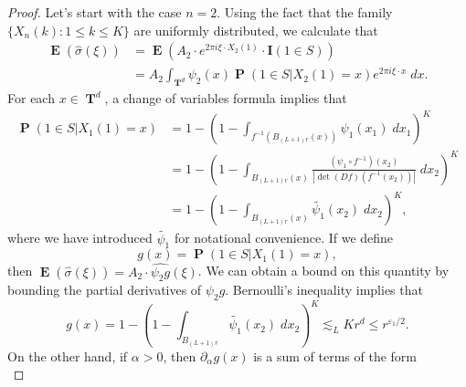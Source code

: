 \documentclass[dvipsnames,letterpaper,12pt]{article}
\numberwithin{equation}{section}
\DeclareMathOperator{\TT}{\mathbf{T}}
\numberwithin{theorem}{section}
\DeclareMathOperator{\EE}{\mathbf{E}}
\DeclareMathOperator{\PP}{\mathbf{P}}
\begin{document}
\begin{proof}


    Let's start with the case $n = 2$. Using the fact that the family $\{ X_n(k) : 1 \leq k \leq K \}$ are uniformly distributed, we calculate that
    \begin{equation} \label{equationDJACIOJCOWIJ}
    \begin{split}
        \EE(\widehat{\sigma}(\xi)) &= \EE ( A_2 \cdot e^{2 \pi i \xi \cdot X_2(1)} \cdot \mathbf{I}(1 \in S) )\\
        &= A_2 \int_{\TT^d} \psi_2(x) \PP \left( 1 \in S | X_2(1) = x \right) e^{2 \pi i \xi \cdot x}\; dx.
    \end{split}
    \end{equation}
    For each $x \in \TT^d$, a change of variables formula implies that
    \begin{equation}
    \begin{split}
        \PP(1 \in S | X_1(1) = x) &= 1 - \left( 1 - \int_{f^{-1}(B_{(L+1)r}(x))} \psi_1(x_1)\; dx_1 \right)^K\\
        &= 1 - \left( 1 - \int_{B_{(L+1) r}(x)} \frac{(\psi_1 \circ f^{-1})(x_2)}{|\det(Df)(f^{-1}(x_2))|}\; dx_2 \right)^K\\
        &= 1 - \left( 1 - \int_{B_{(L+1)r}(x)} \tilde{\psi_1}(x_2)\; dx_2 \right)^K,
    \end{split}
    \end{equation}
    where we have introduced $\tilde{\psi_1}$ for notational convenience. If we define
    \[ g(x) = \PP(1 \in S| X_1(1) = x), \]
    then $\EE(\widehat{\sigma}(\xi)) = A_2 \cdot \widehat{\psi_2 g}(\xi)$. We can obtain a bound on this quantity by bounding the partial derivatives of $\psi_2 g$. Bernoulli's inequality implies that
    \begin{equation}
        g(x) = 1 - \left( 1 - \int_{B_{(L+1)r}} \tilde{\psi_1}(x_2)\; dx_2 \right)^K \lesssim_L K r^d \leq r^{\varepsilon_1/2}.
    \end{equation}
    On the other hand, if $\alpha > 0$, then $\partial_\alpha g(x)$ is a sum of terms of the form
    \begin{equation} \label{equationDOIJACOIJCIOJ3123123214312}

\end{equation}
\end{proof}
\end{document}
